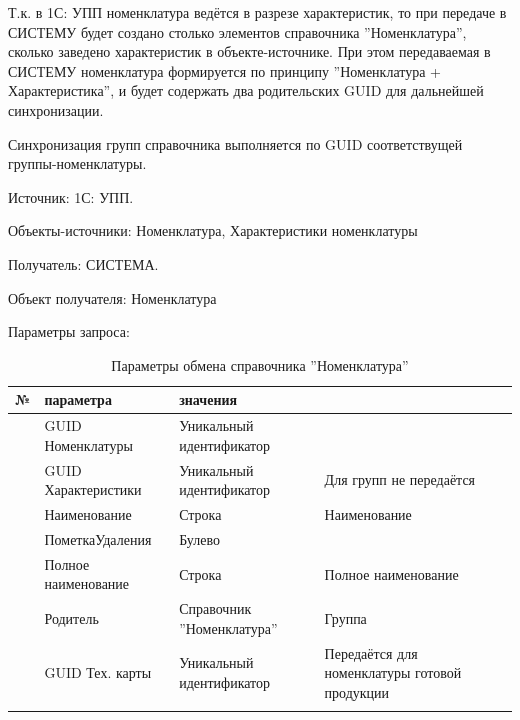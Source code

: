 Т.к. в 1С: УПП номенклатура ведётся в разрезе характеристик, то при передаче в СИСТЕМУ будет создано столько элементов справочника ''Номенклатура'', сколько заведено характеристик в объекте-источнике. При этом передаваемая в СИСТЕМУ номенклатура формируется по принципу ''Номенклатура + Характеристика'', и будет содержать два родительских GUID для дальнейшей синхронизации.

Синхронизация групп справочника выполняется по GUID соответствущей группы-номенклатуры.

Источник: 1С: УПП.

Объекты-источники: Номенклатура, Характеристики номенклатуры

Получатель: СИСТЕМА.

Объект получателя: Номенклатура

Параметры запроса:

\scriptsize
\pc

\begin{longtable}{|p{10mm}|p{35mm}|p{40mm}|p{60mm}|}
\hline
\parbox[c][5mm]{10mm}{\centering№} & \parbox[c]{35mm}{ параметра} & \parbox[c]{40mm}{ значения} & \parbox[c]{60mm}{} \\
\hline
\parbox[c][5mm]{16mm}{\p} &  GUID Номенклатуры & Уникальный идентификатор &         \\
\hline
\parbox[c][5mm]{16mm}{\p} &  GUID Характеристики & Уникальный идентификатор & Для групп не передаётся \\
\hline
\parbox[c][5mm]{16mm}{\p} & Наименование &     Строка & Наименование \\
\hline
\parbox[c][5mm]{16mm}{\p} & ПометкаУдаления & Булево & \\
\hline
\parbox[c][5mm]{16mm}{\p} & Полное наименование &     Строка & Полное наименование \\
\hline
\parbox[c][5mm]{16mm}{\p} & Родитель & Справочник ''Номенклатура'' & Группа \\
\hline
\parbox[c][5mm]{16mm}{\p} & GUID Тех. карты & Уникальный идентификатор & Передаётся для номенклатуры готовой продукции \\
\hline

\caption{Параметры обмена справочника ''Номенклатура''}\label{ex:nomenclature}
\end{longtable}  
\normalsize

